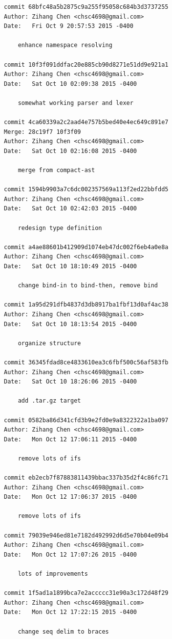 \documentclass{report}
\begin{document}
\begin{appendices}
\begin{verbatim}
commit 68bfc48a5b2875c9a255f95058c684b3d3737255
Author: Zihang Chen <chsc4698@gmail.com>
Date:   Fri Oct 9 20:57:53 2015 -0400

    enhance namespace resolving

commit 10f3f091ddfac20e885cb90d8271e51dd9e921a1
Author: Zihang Chen <chsc4698@gmail.com>
Date:   Sat Oct 10 02:09:38 2015 -0400

    somewhat working parser and lexer

commit 4ca60339a2c2aad4e757b5bed40e4ec649c891e7
Merge: 28c19f7 10f3f09
Author: Zihang Chen <chsc4698@gmail.com>
Date:   Sat Oct 10 02:16:08 2015 -0400

    merge from compact-ast

commit 1594b9903a7c6dc002357569a113f2ed22bbfdd5
Author: Zihang Chen <chsc4698@gmail.com>
Date:   Sat Oct 10 02:42:03 2015 -0400

    redesign type definition

commit a4ae88601b412909d1074eb47dc002f6eb4a0e8a
Author: Zihang Chen <chsc4698@gmail.com>
Date:   Sat Oct 10 18:10:49 2015 -0400

    change bind-in to bind-then, remove bind

commit 1a95d291dfb4837d3db8917ba1fbf13d0af4ac38
Author: Zihang Chen <chsc4698@gmail.com>
Date:   Sat Oct 10 18:13:54 2015 -0400

    organize structure

commit 36345fdad8ce4833610ea3c6fbf500c56af583fb
Author: Zihang Chen <chsc4698@gmail.com>
Date:   Sat Oct 10 18:26:06 2015 -0400

    add .tar.gz target

commit 0582ba86d341cfd3b9e2fd0e9a8322322a1ba097
Author: Zihang Chen <chsc4698@gmail.com>
Date:   Mon Oct 12 17:06:11 2015 -0400

    remove lots of ifs

commit eb2ecb7f87883811439bbac337b35d2f4c86fc71
Author: Zihang Chen <chsc4698@gmail.com>
Date:   Mon Oct 12 17:06:37 2015 -0400

    remove lots of ifs

commit 79039e946ed81e7182d492992d6d5e70b04e09b4
Author: Zihang Chen <chsc4698@gmail.com>
Date:   Mon Oct 12 17:07:26 2015 -0400

    lots of improvements

commit 1f5ad1a1899bca7e2accccc31e90a3c172d48f29
Author: Zihang Chen <chsc4698@gmail.com>
Date:   Mon Oct 12 17:22:15 2015 -0400

    change seq delim to braces


\end{verbatim}
\end{appendices}
\end{document}
